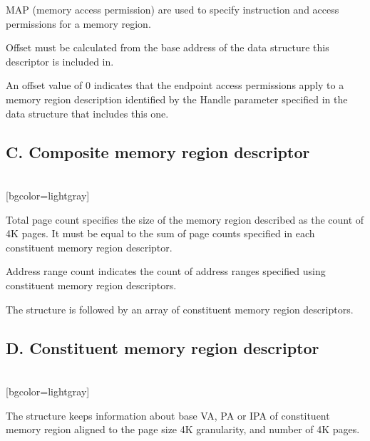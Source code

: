 \documentclass{article}
\begin{document}
MAP (memory access permission) are used to specify instruction and access permissions for a memory region.

Offset must be calculated from the base address of
the data structure this descriptor is included in.

An offset value of 0 indicates that the endpoint
access permissions apply to a memory region
description identified by the Handle parameter
specified in the data structure that includes this
one.

\subsection*{C. Composite memory region descriptor}

\begin{bytefield}[bitwidth=2.5em]{16}
	\\	
	[bgcolor=lightgray]{}
\end{bytefield}

Total page count specifies the size of the memory region described as the count
of 4K pages. It must be equal to the sum of page counts specified
in each constituent memory region descriptor.

Address range count indicates the count of address ranges specified using
constituent memory region descriptors.

The structure is followed by an array of constituent memory region descriptors.

\subsection*{D. Constituent memory region descriptor}

\begin{bytefield}[bitwidth=2.5em]{16}
	\\	
	[bgcolor=lightgray]{}
\end{bytefield}

The structure keeps information about base VA, PA or IPA of constituent memory region aligned to
the page size 4K granularity, and number of 4K pages.
\end{document}
